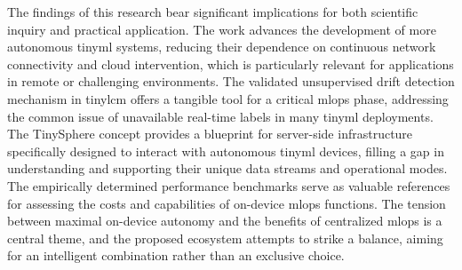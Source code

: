The findings of this research bear significant implications for both scientific inquiry and practical application. The work advances the development of more autonomous \gls{tinyml} systems, reducing their dependence on continuous network connectivity and cloud intervention, which is particularly relevant for applications in remote or challenging environments. The validated unsupervised drift detection mechanism in \gls{tinylcm} offers a tangible tool for a critical \gls{mlops} phase, addressing the common issue of unavailable real-time labels in many \gls{tinyml} deployments. The TinySphere concept provides a blueprint for server-side infrastructure specifically designed to interact with autonomous \gls{tinyml} devices, filling a gap in understanding and supporting their unique data streams and operational modes. The empirically determined performance benchmarks serve as valuable references for assessing the costs and capabilities of on-device \gls{mlops} functions. The tension between maximal on-device autonomy and the benefits of centralized \gls{mlops} is a central theme, and the proposed ecosystem attempts to strike a balance, aiming for an intelligent combination rather than an exclusive choice.